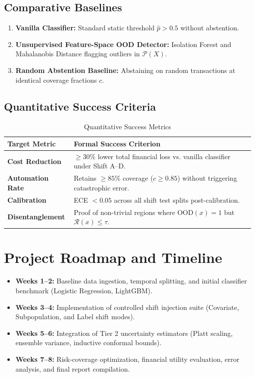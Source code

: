 \documentclass[10pt,a4paper,twocolumn]{article}
\begin{document}
\subsection{Comparative Baselines}
\begin{enumerate}
  \item \textbf{Vanilla Classifier:} Standard static threshold $\hat{p} > 0.5$ without abstention.
  \item \textbf{Unsupervised Feature-Space OOD Detector:} Isolation Forest and Mahalanobis Distance flagging outliers in $\mathcal{P}(X)$.
  \item \textbf{Random Abstention Baseline:} Abstaining on random transactions at identical coverage fractions $c$.
\end{enumerate}

\subsection{Quantitative Success Criteria}
\begin{table}[htbp]
  \centering
  \small
  \caption{Quantitative Success Metrics}
  \label{tab:success_criteria}
  \begin{tabularx}{\columnwidth}{lX}
    \toprule
    \textbf{Target Metric} & \textbf{Formal Success Criterion} \\
    \midrule
    \textbf{Cost Reduction} & $\ge 30\%$ lower total financial loss vs. vanilla classifier under Shift A--D. \\
    \textbf{Automation Rate} & Retains $\ge 85\%$ coverage ($c \ge 0.85$) without triggering catastrophic error. \\
    \textbf{Calibration} & ECE $< 0.05$ across all shift test splits post-calibration. \\
    \textbf{Disentanglement} & Proof of non-trivial regions where $\text{OOD}(x)=1$ but $\mathcal{R}(x) \le \tau$. \\
    \bottomrule
  \end{tabularx}
\end{table}

\section{Project Roadmap and Timeline}
\begin{itemize}
  \item \textbf{Weeks 1--2:} Baseline data ingestion, temporal splitting, and initial classifier benchmark (Logistic Regression, LightGBM).
  \item \textbf{Weeks 3--4:} Implementation of controlled shift injection suite (Covariate, Subpopulation, and Label shift modes).
  \item \textbf{Weeks 5--6:} Integration of Tier 2 uncertainty estimators (Platt scaling, ensemble variance, inductive conformal bounds).
  \item \textbf{Weeks 7--8:} Risk-coverage optimization, financial utility evaluation, error analysis, and final report compilation.
\end{itemize}
\end{document}
